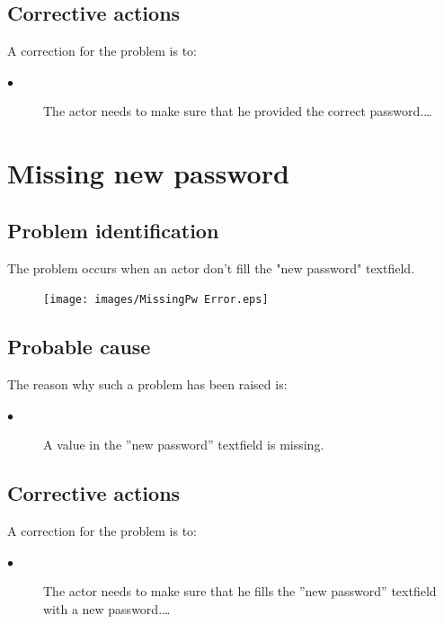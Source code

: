 \subsection{Corrective actions}

A correction for the problem is to:\\
\begin{description}
\item[$\bullet$] The actor needs to make sure that he provided the correct
password.\ldots

\end{description}


\section{Missing new password} 

\subsection{Problem identification}
The problem occurs when an actor don't fill the "new password" textfield.

\begin{figure}[H]
\centering
\texttt{[image: images/MissingPw Error.eps]}
\caption{\label{overflow}}
\end{figure}
\subsection{Probable cause}

The reason why such a problem has been raised is:\\
\begin{description}
\item[$\bullet$] A value in the ''new password'' textfield is missing.
\end{description}


\subsection{Corrective actions}

A correction for the problem is to:\\
\begin{description}
\item[$\bullet$] The actor needs to make sure that he fills the
''new password'' textfield with a new password.\ldots

\end{description}




